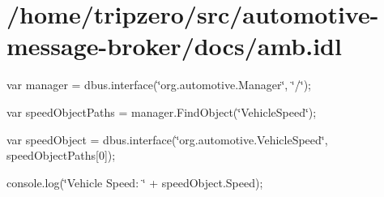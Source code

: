 \hypertarget{_2home_2tripzero_2src_2automotive-message-broker_2docs_2amb_8idl-example}{\section{/home/tripzero/src/automotive-\/message-\/broker/docs/amb.\-idl}
}
var manager = dbus.\-interface(\char`\"{}org.\-automotive.\-Manager\char`\"{}, \char`\"{}/\char`\"{});

var speed\-Object\-Paths = manager.\-Find\-Object(\char`\"{}\-Vehicle\-Speed\char`\"{});

var speed\-Object = dbus.\-interface(\char`\"{}org.\-automotive.\-Vehicle\-Speed\char`\"{}, speed\-Object\-Paths\mbox{[}0\mbox{]});

console.\-log(\char`\"{}\-Vehicle Speed\-: \char`\"{} + speed\-Object.\-Speed);


\begin{DoxyCodeInclude}
\end{DoxyCodeInclude}
 